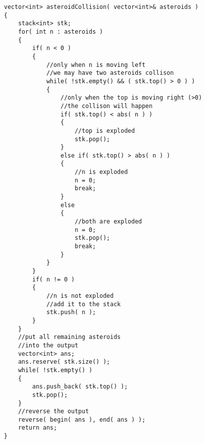 \setcounter{lstlisting}{0}
\begin{lstlisting}[style=customc, caption={Stack}]
vector<int> asteroidCollision( vector<int>& asteroids )
{
    stack<int> stk;
    for( int n : asteroids )
    {
        if( n < 0 )
        {
            //only when n is moving left
            //we may have two asteroids collison
            while( !stk.empty() && ( stk.top() > 0 ) )
            {
                //only when the top is moving right (>0)
                //the collison will happen
                if( stk.top() < abs( n ) )
                {
                    //top is exploded
                    stk.pop();
                }
                else if( stk.top() > abs( n ) )
                {
                    //n is exploded
                    n = 0;
                    break;
                }
                else
                {
                    //both are exploded
                    n = 0;
                    stk.pop();
                    break;
                }
            }
        }
        if( n != 0 )
        {
            //n is not exploded
            //add it to the stack
            stk.push( n );
        }
    }
    //put all remaining asteroids
    //into the output
    vector<int> ans;
    ans.reserve( stk.size() );
    while( !stk.empty() )
    {
        ans.push_back( stk.top() );
        stk.pop();
    }
    //reverse the output
    reverse( begin( ans ), end( ans ) );
    return ans;
}
\end{lstlisting}